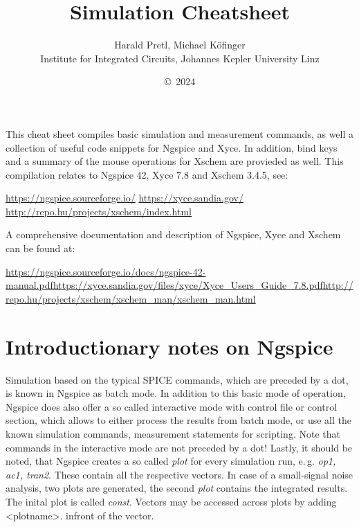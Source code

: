 \documentclass[10pt,a4paper]{article}
\author{Harald Pretl, Michael Köfinger\\Institute for Integrated Circuits, Johannes Kepler University Linz}
\title{Simulation Cheatsheet}
\date{\copyright~2024}
\begin{document}
	\maketitle
	
	This cheat sheet compiles basic simulation and measurement commands, as well a collection of useful code snippets for Ngspice and Xyce. In addition, bind keys and a summary of the mouse operations for Xschem are provieded as well. This compilation relates to Ngspice  42, Xyce 7.8 and Xschem 3.4.5, see:
	
	\url{https://ngspice.sourceforge.io/}\newline
	\url{https://xyce.sandia.gov/}\newline
	\url{http://repo.hu/projects/xschem/index.html}
	
	A comprehensive documentation and description of Ngspice, Xyce and Xschem can be found at:
	
	\url{https://ngspice.sourceforge.io/docs/ngspice-42-manual.pdf}\newline \url{https://xyce.sandia.gov/files/xyce/Xyce_Users_Guide_7.8.pdf}\newline \url{http://repo.hu/projects/xschem/xschem_man/xschem_man.html}
	
	\newpage
	
		\section*{Introductionary notes on Ngspice}
	Simulation based on the typical SPICE commands, which are preceded by a dot, is known in Ngspice as batch mode. In addition to this basic mode of operation, Ngspice does also offer a so called interactive mode with control file or control section, which allows to either process the results from batch mode, or use all the known simulation commands, measurement statements for scripting. Note that commands in the interactive mode are not preceded by a dot!
	Lastly, it should be noted, that Ngspice creates a so called \emph{plot} for every simulation run, e.\,g. \emph{op1, ac1, tran2}. These contain all the respective vectors. In case of a small-signal noise analysis, two plots are generated, the second \emph{plot} contains the integrated results. The inital plot is called \emph{const}. Vectors may be accessed across plots by adding <plotname>. infront of the vector.
	
\end{document}
